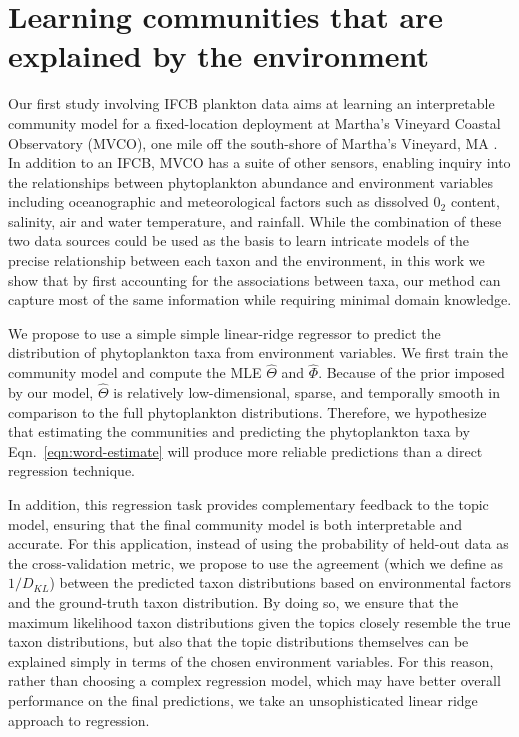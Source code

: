 \section{Learning communities that are explained by the environment} \label{sec:plankton-seasonal}
Our first study involving IFCB plankton data aims at learning an interpretable community model for a fixed-location deployment at Martha's Vineyard Coastal Observatory (MVCO), one mile off the south-shore of Martha's Vineyard, MA \citep{Kalmbach2017}. In addition to an IFCB, MVCO has a suite of other sensors, enabling inquiry into the relationships between phytoplankton abundance and environment variables including oceanographic and meteorological factors such as dissolved $\mathrm{0}_2$ content, salinity, air and water temperature, and rainfall. While the combination of these two data sources could be used as the basis to learn intricate models of the precise relationship between each taxon and the environment, in this work we show that by first accounting for the associations between taxa, our method can capture most of the same information while requiring minimal domain knowledge.

We propose to use a simple simple linear-ridge regressor to predict the distribution of phytoplankton taxa from environment variables. We first train the community model and compute the MLE $\hat{\Theta}$ and $\hat{\Phi}$. Because of the prior imposed by our model, $\hat{\Theta}$ is relatively low-dimensional, sparse, and temporally smooth in comparison to the full phytoplankton distributions. Therefore, we hypothesize that estimating the communities and predicting the phytoplankton taxa by Eqn.~\ref{eqn:word-estimate} will produce more reliable predictions than a direct regression technique.

 In addition, this regression task provides complementary feedback to the topic model, ensuring that the final community model is both interpretable and accurate. For this application, instead of using the probability of held-out data as the cross-validation metric, we propose to use the agreement (which we define as $1/D_{KL}$) between the predicted taxon distributions based on environmental factors and the ground-truth taxon distribution. By doing so, we ensure that the maximum likelihood taxon distributions given the topics closely resemble the true taxon distributions, but also that the topic distributions themselves can be explained simply in terms of the chosen environment variables. For this reason, rather than choosing a complex regression model, which may have better overall performance on the final predictions, we take an unsophisticated linear ridge approach to regression.

